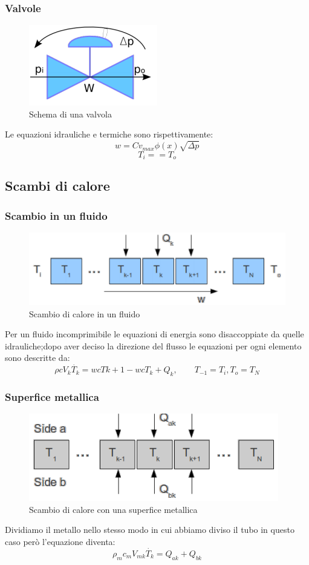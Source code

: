 \subsubsection{Valvole}
\begin{figure}[tbh]
\centering
\includegraphics{img/valvola2.png}
\caption{Schema di una valvola}
\label{fig:valvola2}
\end{figure}
Le equazioni idrauliche e termiche sono rispettivamente:
$$
w=Cv_{max}\phi(x)\sqrt{\Delta p}
$$
$$T_i==T_o$$

\subsection{Scambi di calore}
\subsubsection{Scambio in un fluido}
\begin{figure}[tbh]
\centering
\includegraphics{img/flusso.png}
\caption{Scambio di calore in un fluido}
\label{fig:flusso}
\end{figure}
Per un fluido incomprimibile le equazioni di energia sono disaccoppiate da quelle idrauliche;dopo aver deciso la direzione del flusso le equazioni per ogni elemento sono descritte da:
$$\rho c V_k\dot{T_k}=wcT{k+1}-wcT_k+Q_k, \qquad T_{-1}=T_i, T_o=T_N$$
\subsubsection{Superfice metallica}
\begin{figure}[tbh]
\centering
\includegraphics{img/metal2.png}
\caption{Scambio di calore con una superfice metallica}
\label{fig:metal2}
\end{figure}
Dividiamo il metallo nello stesso modo in cui abbiamo diviso il tubo in questo caso però l'equazione diventa:
$$\rho_mc_mV_{mk}\dot{T_k}=Q_{ak}+Q_{bk}$$
